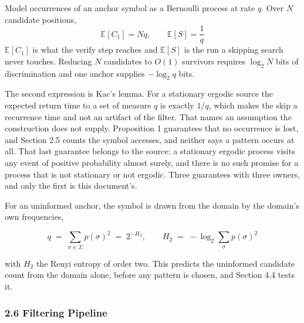 Model occurrences of an anchor symbol as a Bernoulli process at rate \(q\). Over \(N\) candidate positions,
\[
  \mathbb{E}[C_1] = N q, \qquad \mathbb{E}[S] = \frac{1}{q}
\]
\(\mathbb{E}[C_1]\) is what the verify step reaches and \(\mathbb{E}[S]\) is the run a skipping search never touches. Reducing \(N\) candidates to \(O(1)\) survivors requires \(\log_2 N\) bits of discrimination and one anchor supplies \(-\log_2 q\) bits.

The second expression is Kac's lemma. For a stationary ergodic source the expected return time to a set of measure \(q\) is exactly \(1/q\), which makes the skip a recurrence time and not an artifact of the filter. That names an assumption the construction does not supply. Proposition 1 guarantees that no occurrence is lost, and Section 2.5 counts the symbol accesses, and neither says a pattern occurs at all. That last guarantee belongs to the source: a stationary ergodic process visits any event of positive probability almost surely, and there is no such promise for a process that is not stationary or not ergodic. Three guarantees with three owners, and only the first is this document's.

For an uninformed anchor, the symbol is drawn from the domain by the domain's own frequencies,

\[
q \;=\; \sum_{\sigma \in \Sigma} p(\sigma)^2 \;=\; 2^{-H_2}, \qquad
H_2 \;=\; -\log_2 \sum_{\sigma} p(\sigma)^2
\]

with \(H_2\) the Renyi entropy of order two. This predicts the uninformed candidate count from the domain alone, before any pattern is chosen, and Section 4.4 tests it.

\subsubsection{2.6 Filtering Pipeline}

